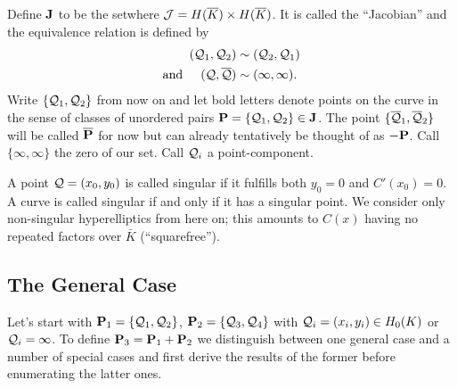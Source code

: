 \documentclass[english,11pt,a4paper]{article}
\begin{document}
\begin{defin}\label{defj}
  Define $\J$ to be the set\scalebox{1.3}{ $\nicefrac{ \j }{\sim }$ }where $\j = \ekb \times \ekb$. It is called the ``Jacobian'' and the equivalence relation is defined by
  \begin{align*}
    (\q_1,\q_2) &\sim (\q_2,\q_1) \\
    \text{and\hspace{5mm}} (\q,\bar \q) & \sim ( \infty , \infty ). 
  \end{align*}
  Write $\{ \q_1,\q_2 \}$ from now on and let bold letters denote points on the curve in the sense of classes of unordered pairs $\P =\{ \q_1, \q_2 \} \in \J$. The point $\{ \bar \q_1, \bar \q_2 \}$ will be called $\bar \P$ for now but can already tentatively be thought of as $-\P$. Call $\{ \infty, \infty \}$ the zero of our set. Call $\q_i$ a point-component.%

  A point $\q = (x_0,y_0)$ is called singular if it fulfills both $y_0=0$ and $C'(x_0) = 0$. A curve is called singular if and only if it has a singular point. We consider only non-singular hyperelliptics from here on; this amounts to $C(x)$ having no repeated factors over $\bar K$ (``squarefree'').%
\end{defin}

\subsection{The General Case}

Let's start with $\P_1 = \{\q_1,\q_2\}$, $\P_2 = \{\q_3,\q_4\}$ with $\q_i = (x_i,y_i) \in \enk$ or $\q_i = \infty$. To define $\P_3 = \P_1 + \P_2$ we distinguish between one general case and a number of special cases and first derive the results of the former before enumerating the latter ones.
\end{document}

